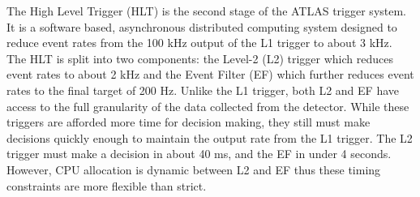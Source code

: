 The High Level Trigger (HLT) is the second stage of the ATLAS trigger system. It is a software based, asynchronous distributed computing system designed to reduce event rates from the 100 kHz output of the L1 trigger to about 3 kHz. The HLT is split into two components: the Level-2 (L2) trigger which reduces event rates to about 2 kHz and the Event Filter (EF) which further reduces event rates to the final target of 200 Hz. Unlike the L1 trigger, both L2 and EF have access to the full granularity of the data collected from the detector. While these triggers are afforded more time for decision making, they still must make decisions quickly enough to maintain the output rate from the L1 trigger. The L2 trigger must make a decision in about 40 ms, and the EF in under 4 seconds. However, CPU allocation is dynamic between L2 and EF thus these timing constraints are more flexible than strict. 